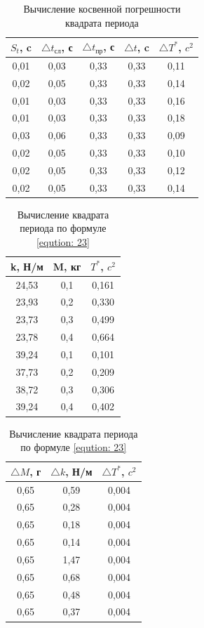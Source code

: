 \begin{table}[H]
	\caption{Вычисление косвенной погрешности квадрата периода}
	\centering
	\label{tabular: 1}
	\begin{tabular}{|c|c|c|c|c|}
		\hline
		$S_t$, c & $\triangle t_{\text{сл}}$, с & $\triangle t_{\text{пр}}$, с & $\triangle t$, c & $\triangle T^*$, $c^2$ \\
		\hline
		0,01 & 0,03 & 0,33 & 0,33 & 0,11 \\
		\hline
		0,02 & 0,05 & 0,33 & 0,33 & 0,14 \\
		\hline
		0,01 & 0,03 & 0,33 & 0,33 & 0,16 \\
		\hline
		0,01 & 0,03 & 0,33 & 0,33 & 0,18 \\
		\hline
		0,03 & 0,06 & 0,33 & 0,33 & 0,09 \\
		\hline
		0,02 & 0,05 & 0,33 & 0,33 & 0,10 \\
		\hline
		0,02 & 0,05 & 0,33 & 0,33 & 0,12 \\
		\hline
		0,02 & 0,05 & 0,33 & 0,33 & 0,14 \\
		\hline
	\end{tabular}
\end{table}

\begin{table}[H]
	\caption{Вычисление квадрата периода по формуле \ref{eqution: 23}}
	\centering
	\label{tabular:measuring_6}
	\begin{tabular}{|c|c|c|}
		\hline
		k, Н/м & M, кг & $T^*$, $c^2$ \\ \hline
		24,53  &  0,1  &    0,161     \\ \hline
		23,93  &  0,2  &    0,330     \\ \hline
		23,73  &  0,3  &    0,499     \\ \hline
		23,78  &  0,4  &    0,664     \\ \hline
		39,24  &  0,1  &    0,101     \\ \hline
		37,73  &  0,2  &    0,209     \\ \hline
		38,72  &  0,3  &    0,306     \\ \hline
		39,24  &  0,4  &    0,402     \\ \hline
	\end{tabular}
	\begin{tabular}{|c|c|c|}
		\hline
		$\triangle M$, г & $\triangle k$, Н/м & $\triangle T^*$, $c^2$\\ \hline
		      0,65       &        0,59        & 0,004\\ \hline
		      0,65       &        0,28        & 0,004\\ \hline
		      0,65       &        0,18        & 0,004 \\ \hline
		      0,65       &        0,14        & 0,004 \\ \hline
		      0,65       &        1,47        & 0,004 \\ \hline
		      0,65       &        0,68        & 0,004 \\ \hline
		      0,65       &        0,48        & 0,004 \\ \hline
		      0,65       &        0,37        & 0,004 \\ \hline
	\end{tabular}
\end{table}

